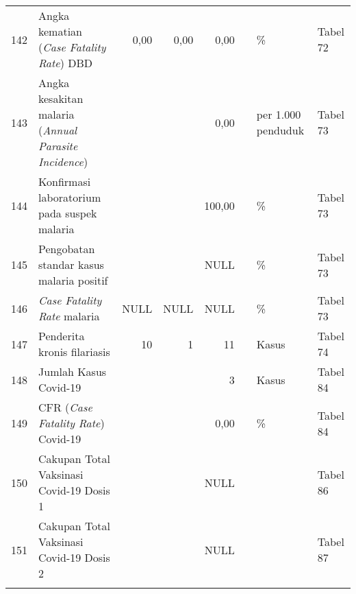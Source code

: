 \begin{small}
\begin{longtable}{rY{12em}rrrrY{5em}Y{5em}}
	142 & Angka kematian (\emph{Case Fatality Rate}) DBD                                        &   0,00 &   0,00 &    0,00 &                   & \%                             & Tabel 72 \\
	                  143 & Angka kesakitan malaria (\emph{Annual Parasite Incidence})                            &        &        &    0,00 &                   & per 1.000 penduduk             & Tabel 73 \\
	144 & Konfirmasi laboratorium pada suspek malaria                                           &        &        &  100,00 &                   & \%                             & Tabel 73 \\
	                  145 & Pengobatan standar kasus malaria positif                                              &        &        &    NULL &                   & \%                             & Tabel 73 \\
	146 & \emph{Case Fatality Rate} malaria                                                     &   NULL &   NULL &    NULL &                   & \%                             & Tabel 73 \\
	                  147 & Penderita kronis filariasis                                                           &     10 &      1 &      11 &                   & Kasus                          & Tabel 74 \\
	148 & Jumlah Kasus Covid-19                                                                 &        &        &       3 &                   & Kasus                          & Tabel 84 \\
	                  149 & CFR (\emph{Case Fatality Rate}) Covid-19                                              &        &        &    0,00 &                   & \%                             & Tabel 84 \\
	150 & Cakupan Total Vaksinasi Covid-19 Dosis 1                                              &        &        &    NULL &                   &                                & Tabel 86 \\
	                  151 & Cakupan Total Vaksinasi Covid-19 Dosis 2                                              &        &        &    NULL &                   &                                & Tabel 87 \\
	                      &                                                                                       &        &        &         &                   &                                &          \\

\end{longtable}
\end{small}
